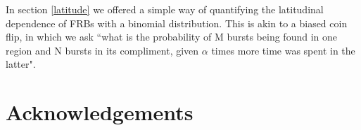 \documentclass[useAMS,usenatbib]{mn2e}
\begin{document}
In section \ref{latitude} we offered a simple way of quantifying the 
latitudinal dependence of FRBs with a binomial distribution. This 
is akin to a biased coin flip, in which we ask ``what is the probability of 
M bursts being found in one region and N bursts in its compliment, given 
$\alpha$ times more time was spent in the latter". 

\section{Acknowledgements}


\newcommand{\araa}{ARA\&A}   %
\newcommand{\afz}{Afz}       %
\newcommand{\aj}{AJ}         %
\newcommand{\azh}{AZh}       %
\newcommand{\aaa}{A\&A}      %
\newcommand{\aas}{A\&AS}     %
\newcommand{\aar}{A\&AR}     %
\newcommand{\apj}{ApJ}       %
\newcommand{\apjs}{ApJS}     %
\newcommand{\apjl}{ApJ}      %
\newcommand{\apss}{Ap\&SS}   %
\newcommand{\baas}{BAAS}     %
\newcommand{\jaa}{JA\&A}     %
\newcommand{\mnras}{MNRAS}   %
\newcommand{\nat}{Nat}       %
\newcommand{\pasj}{PASJ}     %
\newcommand{\pasp}{PASP}     %
\newcommand{\paspc}{PASPC}   %
\newcommand{\qjras}{QJRAS}   %
\newcommand{\sci}{Sci}       %
\newcommand{\solphys}{Solar Physics}       %
\newcommand{\sova}{SvA}      %
\newcommand{\aap}{A\&A}
\newcommand\jcap{{J. Cosmology Astropart. Phys.}}%
\newcommand{\prd}{Phys. Rev. D}

%




\label{lastpage}
\end{document}
